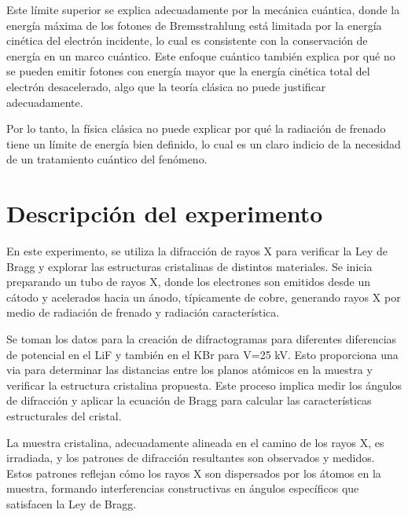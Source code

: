 \vspace{\baselineskip}

Este límite superior se explica adecuadamente por la mecánica cuántica, donde la energía máxima de los fotones de Bremsstrahlung está limitada por la energía cinética del electrón incidente, lo cual es consistente con la conservación de energía en un marco cuántico. Este enfoque cuántico también explica por qué no se pueden emitir fotones con energía mayor que la energía cinética total del electrón desacelerado, algo que la teoría clásica no puede justificar adecuadamente.

\vspace{\baselineskip}

Por lo tanto, la física clásica no puede explicar por qué la radiación de frenado tiene un límite de energía bien definido, lo cual es un claro indicio de la necesidad de un tratamiento cuántico del fenómeno.


\section{Descripción del experimento}


En este experimento, se utiliza la difracción de rayos X para verificar la Ley de Bragg y explorar las estructuras cristalinas de distintos materiales. Se inicia preparando un tubo de rayos X, donde los electrones son emitidos desde un cátodo y acelerados hacia un ánodo, típicamente de cobre, generando rayos X por medio de radiación de frenado y radiación característica.

\vspace{\baselineskip}

Se toman los datos para la creación de  difractogramas para diferentes diferencias de potencial en el LiF y también en el KBr para V=25 kV. Esto proporciona una via para determinar las distancias entre los planos atómicos en la muestra y verificar la estructura cristalina propuesta. Este proceso implica medir los ángulos de difracción y aplicar la ecuación de Bragg para calcular las características estructurales del cristal.

\vspace{\baselineskip}

La muestra cristalina, adecuadamente alineada en el camino de los rayos X, es irradiada, y los patrones de difracción resultantes son observados y medidos. Estos patrones reflejan cómo los rayos X son dispersados por los átomos en la muestra, formando interferencias constructivas en ángulos específicos que satisfacen la Ley de Bragg.


